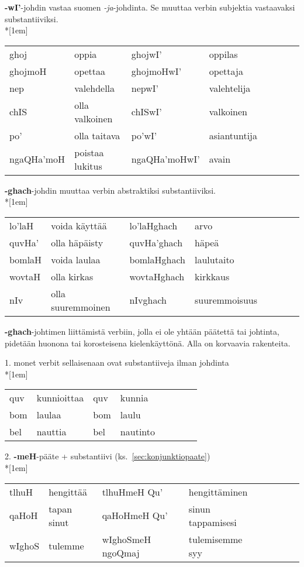 \documentclass{book}
\begin{document}
\textbf{-wI'}-johdin vastaa suomen \textit{-ja}-johdinta.
Se muuttaa verbin subjektia vastaavaksi substantiiviksi.
\\*[1em]
\begin{tabular}{Bl Il | Bl Il}
    ghoj & oppia & ghojwI' & oppilas \\
    ghojmoH & opettaa & ghojmoHwI' & opettaja \\
    nep & valehdella & nepwI' & valehtelija \\
    chIS & olla valkoinen & chISwI' & valkoinen \\
    po' & olla taitava & po'wI' & asiantuntija \\
    ngaQHa'moH & poistaa lukitus & ngaQHa'moHwI' & avain \\
\end{tabular}

\textbf{-ghach}-johdin muuttaa verbin abstraktiksi substantiiviksi.
\\*[1em]
\begin{tabular}{Bl Il | Bl Il}
    lo'laH & voida käyttää & lo'laHghach & arvo \\
    quvHa' & olla häpäisty & quvHa'ghach & häpeä \\
    bomlaH & voida laulaa & bomlaHghach & laulutaito \\
    wovtaH & olla kirkas & wovtaHghach & kirkkaus \\
    nIv & olla suuremmoinen & nIvghach & suuremmoisuus \\
\end{tabular}

\textbf{-ghach}-johtimen liittämistä verbiin, jolla ei ole yhtään päätettä tai johtinta, pidetään huonona tai korosteisena kielenkäyttönä. Alla on korvaavia rakenteita.

1. monet verbit sellaisenaan ovat substantiiveja ilman johdinta\\*[1em]
\begin{tabular}{Bl Il | Bl Il}
    quv & kunnioittaa & quv & kunnia \\
    bom & laulaa & bom & laulu \\
    bel & nauttia & bel & nautinto \\
\end{tabular}

2. \textbf{-meH}-pääte + substantiivi (ks.~\ref{sec:konjunktiopaate})\\*[1em]
\begin{tabular}{Bl Il | Bl Il}
    tlhuH & hengittää & tlhuHmeH Qu' & hengittäminen \\
    qaHoH & tapan sinut & qaHoHmeH Qu' & sinun tappamisesi \\
    wIghoS & tulemme & wIghoSmeH ngoQmaj & tulemisemme syy \\
\end{tabular}
\end{document}
